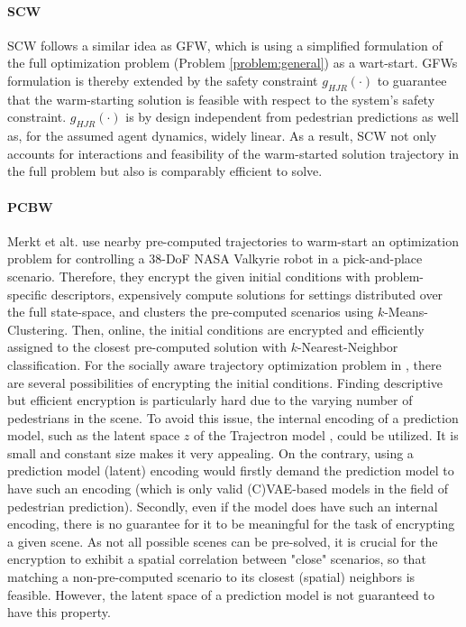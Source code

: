 \paragraph{\ac{SCW}} 
SCW follows a similar idea as \ac{GFW}, which is using a simplified formulation of the full optimization problem (Problem \ref{problem:general}) as a wart-start. \ac{GFW}s formulation is thereby extended by the safety constraint $g_{HJR}(\cdot)$ to guarantee that the warm-starting solution is feasible with respect to the system's safety constraint. $g_{HJR}(\cdot)$ is by design independent from pedestrian predictions as well as, for the assumed agent dynamics, widely linear. As a result, \ac{SCW} not only accounts for interactions and feasibility of the warm-started solution trajectory in the full problem but also is comparably efficient to solve.

\paragraph{\ac{PCBW}}
Merkt et alt. \cite{Merkt2018} use nearby pre-computed trajectories to warm-start an optimization problem for controlling a 38-DoF NASA Valkyrie robot in a pick-and-place scenario. Therefore, they encrypt the given initial conditions with problem-specific descriptors, expensively compute solutions for settings distributed over the full state-space, and clusters the pre-computed scenarios using $k$-Means-Clustering. Then, online, the initial conditions are encrypted and efficiently assigned to the closest pre-computed solution with $k$-Nearest-Neighbor classification. 
\newline
For the socially aware trajectory optimization problem in \project, there are several possibilities of encrypting the initial conditions. Finding descriptive but efficient encryption is particularly hard due to the varying number of pedestrians in the scene. To avoid this issue, the internal encoding of a prediction model, such as the latent space $z$ of the Trajectron model \cite{Ivanovic2018}, could be utilized. It is small and constant size makes it very appealing. On the contrary, using a prediction model (latent) encoding would firstly demand the prediction model to have such an encoding (which is only valid (C)\ac{VAE}-based models in the field of pedestrian prediction). Secondly, even if the model does have such an internal encoding, there is no guarantee for it to be meaningful for the task of encrypting a given scene. As not all possible scenes can be pre-solved, it is crucial for the encryption to exhibit a spatial correlation between "close" scenarios, so that matching a non-pre-computed scenario to its closest (spatial) neighbors is feasible. However, the latent space of a prediction model is not guaranteed to have this property. 

